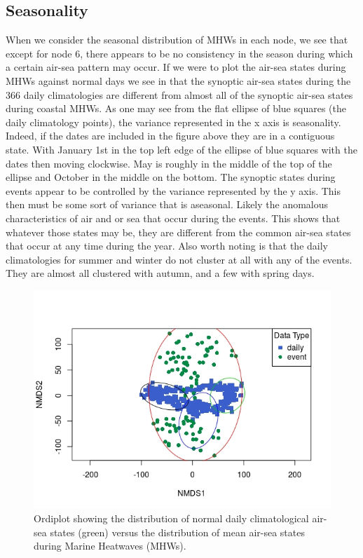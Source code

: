 \documentclass[a4paper,10pt,review]{elsarticle}
\begin{document}
\subsection{Seasonality}
When we consider the seasonal distribution of MHWs in each node, we see that except for node 6, there appears to be no consistency in the season during which a certain air-sea pattern may occur. If we were to plot the air-sea states during MHWs against normal days we see in  that the synoptic air-sea states during the 366 daily climatologies are different from almost all of the synoptic air-sea states during coastal MHWs. As one may see from the flat ellipse of blue squares (the daily climatology points), the variance represented in the x axis is seasonality. Indeed, if the dates are included in the figure above they are in a contiguous state. With January 1st in the top left edge of the ellipse of blue squares with the dates then moving clockwise. May is roughly in the middle of the top of the ellipse and October in the middle on the bottom. The synoptic states during events appear to be controlled by the variance represented by the y axis. This then must be some sort of variance that is aseasonal. Likely the anomalous characteristics of air and or sea that occur during the events. This shows that whatever those states may be, they are different from the common air-sea states that occur at any time during the year. Also worth noting is that the daily climatologies for summer and winter do not cluster at all with any of the events. They are almost all clustered with autumn, and a few with spring days.

\begin{figure}
\includegraphics[width=1.0\textwidth]{figure_5.jpeg}
\caption{Ordiplot showing the distribution of normal daily climatological air-sea states (green) versus the distribution of mean air-sea states during Marine Heatwaves (MHWs).}
\label{figure5}
\end{figure}
\end{document}
